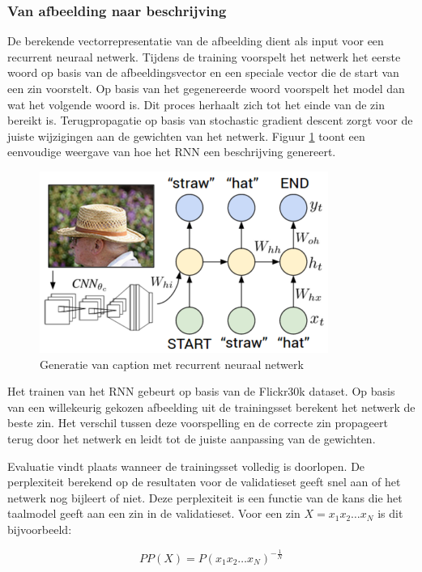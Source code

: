 \subsubsection{Van afbeelding naar beschrijving}
De berekende vectorrepresentatie van de afbeelding dient als input voor een recurrent neuraal netwerk. Tijdens de training voorspelt het netwerk het eerste woord op basis van de afbeeldingsvector en een speciale vector die de start van een zin voorstelt. Op basis van het gegenereerde woord voorspelt het model dan wat het volgende woord is. Dit proces herhaalt zich tot het einde van de zin bereikt is. Terugpropagatie op basis van stochastic gradient descent zorgt voor de juiste wijzigingen aan de gewichten van het netwerk. Figuur \ref{fig:rnntraining} toont een eenvoudige weergave van hoe het RNN een beschrijving genereert.

\begin{figure}[tb]
    \centering
    \includegraphics[width=0.5\linewidth]{Images/karpathy.PNG}
    \caption{Generatie van caption met recurrent neuraal netwerk}
\label{fig:rnntraining}
\end{figure}

Het trainen van het RNN gebeurt op basis van de Flickr30k dataset. 
Op basis van een willekeurig gekozen afbeelding uit de trainingsset berekent het netwerk de beste zin. Het verschil tussen deze voorspelling en de correcte zin propageert terug door het netwerk en leidt tot de juiste aanpassing van de gewichten.

Evaluatie vindt plaats wanneer de trainingsset volledig is doorlopen. De perplexiteit berekend op de resultaten voor de validatieset geeft snel aan of het netwerk nog bijleert of niet. Deze perplexiteit is een functie van de kans die het taalmodel geeft aan een zin in de validatieset. Voor een zin $X=x_1x_2\dots x_N$ is dit bijvoorbeeld\cite{Jurafsky:2009:SLP:1214993}:

\begin{equation}
PP(X)=P(x_1x_2\dots x_N)^{-\frac{1}{N}}
\end{equation}

